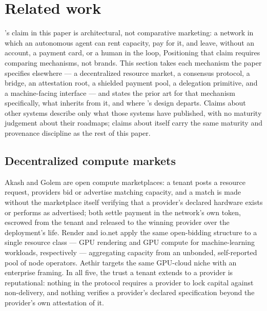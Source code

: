 \section{Related work}\label{sec:related-work}

\Flux's claim in this paper is architectural, not comparative marketing: a network in which an
autonomous agent can rent capacity, pay for it, and leave, without an account, a payment card, or a
human in the loop,  Positioning that claim requires comparing mechanisms, not brands. This section takes
each mechanism the paper specifies elsewhere — a decentralized resource market, a consensus protocol,
a bridge, an attestation root, a shielded payment pool, a delegation primitive, and a machine-facing
interface — and states the prior art for that mechanism specifically, what \Flux inherits from it, and
where \Flux's design departs. Claims about other systems describe only what those systems have
published, with no maturity judgement about their roadmaps; claims about \Flux itself carry the same
maturity and provenance discipline as the rest of this paper.

\subsection{Decentralized compute markets}

Akash \citep{akash} and Golem \citep{golem} are open compute marketplaces: a tenant posts a resource
request, providers bid or advertise matching capacity, and a match is made without the marketplace
itself verifying that a provider's declared hardware exists or performs as advertised; both settle
payment in the network's own token, escrowed from the tenant and released to the winning provider over
the deployment's life. Render \citep{render} and io.net \citep{ionet} apply the same open-bidding
structure to a single resource class — GPU rendering and GPU compute for machine-learning workloads,
respectively — aggregating capacity from an unbonded, self-reported pool of node operators. Aethir
\citep{aethir} targets the same GPU-cloud niche with an enterprise framing. In all five, the trust a
tenant extends to a provider is reputational: nothing in the protocol requires a provider to lock
capital against non-delivery, and nothing verifies a provider's declared specification beyond the
provider's own attestation of it.

